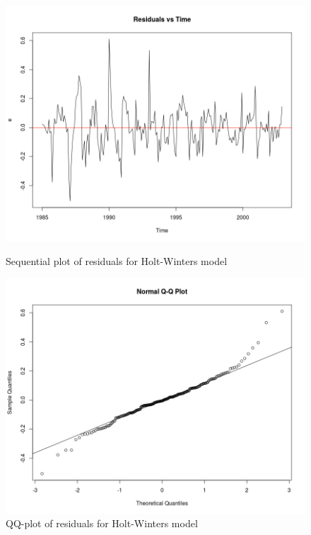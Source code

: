 \documentclass[]{article}
\begin{document}
\begin{figure}[!ht]
\centering
\begin{minipage}{.5\textwidth}
\centering
\includegraphics[width=\linewidth]{seq_hw}
\caption{Sequential plot of residuals for Holt-Winters model}
\label{seq_hw}
\end{minipage}%
\begin{minipage}{.5\textwidth}
\centering
\includegraphics[width=\linewidth]{qq_hw}
\caption{QQ-plot of residuals for Holt-Winters model}
\label{qq_hw}
\end{minipage}
\end{figure}
\end{document}
